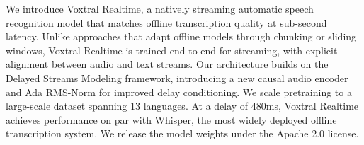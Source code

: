 We introduce Voxtral Realtime, a natively streaming automatic speech recognition model that matches offline transcription quality at sub-second latency. Unlike approaches that adapt offline models through chunking or sliding windows, Voxtral Realtime is trained end-to-end for streaming, with explicit alignment between audio and text streams. Our architecture builds on the Delayed Streams Modeling framework, introducing a new causal audio encoder and Ada RMS-Norm for improved delay conditioning. We scale pretraining to a large-scale dataset spanning 13 languages. At a delay of 480ms, Voxtral Realtime achieves performance on par with Whisper, the most widely deployed offline transcription system. We release the model weights under the Apache 2.0 license.